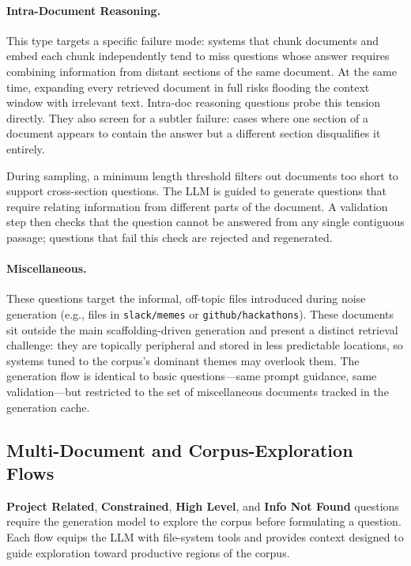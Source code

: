\documentclass{article}
\begin{document}
\paragraph{Intra-Document Reasoning.}
This type targets a specific failure mode: systems that chunk documents and embed each chunk independently tend to miss questions whose answer requires combining information from distant sections of the same document. At the same time, expanding every retrieved document in full risks flooding the context window with irrelevant text. Intra-doc reasoning questions probe this tension directly. They also screen for a subtler failure: cases where one section of a document appears to contain the answer but a different section disqualifies it entirely.

During sampling, a minimum length threshold filters out documents too short to support cross-section questions. The LLM is guided to generate questions that require relating information from different parts of the document. A validation step then checks that the question cannot be answered from any single contiguous passage; questions that fail this check are rejected and regenerated.

\paragraph{Miscellaneous.}
These questions target the informal, off-topic files introduced during noise generation (e.g., files in \texttt{slack/memes} or \texttt{github/hackathons}). These documents sit outside the main scaffolding-driven generation and present a distinct retrieval challenge: they are topically peripheral and stored in less predictable locations, so systems tuned to the corpus's dominant themes may overlook them. The generation flow is identical to basic questions---same prompt guidance, same validation---but restricted to the set of miscellaneous documents tracked in the generation cache.

\subsection{Multi-Document and Corpus-Exploration Flows}
\label{app:multi_doc}

\textbf{Project Related}, \textbf{Constrained}, \textbf{High Level}, and \textbf{Info Not Found} questions require the generation model to explore the corpus before formulating a question. Each flow equips the LLM with file-system tools and provides context designed to guide exploration toward productive regions of the corpus.
\end{document}
